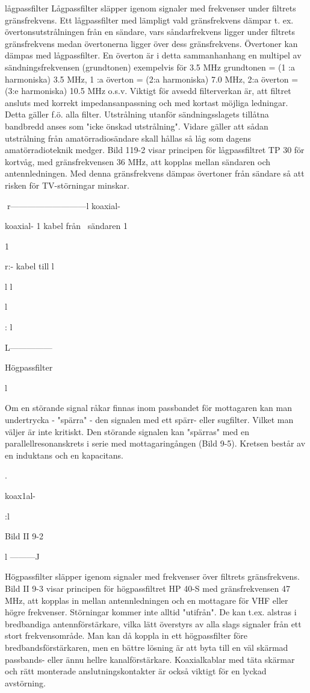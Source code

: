 \documentclass[a4paper,twoside,twocolumn,openright]{book}
\begin{document}
{{{{{lågpassfilter
Lågpassfilter släpper igenom signaler med
frekvenser under filtrets gränsfrekvens.
Ett lågpassfilter med lämpligt vald gränsfrekvens dämpar t. ex. övertonsutstrålningen
från en sändare, vars såndarfrekvens ligger
under filtrets gränsfrekvens medan övertonerna ligger över dess gränsfrekvens.
Övertoner kan dämpas med lågpassfilter. En överton är i detta sammanhanhang
en multipel av sändningsfrekvensen (grundtonen) exempelvis för 3.5 MHz
grundtonen = (1 :a harmoniska) 3.5 MHz,
1 :a överton = (2:a harmoniska) 7.0 MHz,
2:a överton = (3:e harmoniska) 10.5 MHz
o.s.v.
Viktigt för avsedd filterverkan är, att filtret
ansluts med korrekt impedansanpassning
och med kortast möjliga ledningar. Detta
gäller f.ö. alla filter.
Utstrålning utanför sändningsslagets tillåtna bandbredd anses som "icke önskad
utstrålning". Vidare gäller att sådan utstrålning från amatörradiosändare skall hållas så
låg som dagens amatörradioteknik medger.
Bild 119-2 visar principen för lågpassfiltret TP
30 för kortvåg, med gränsfrekvensen 36
MHz, att kopplas mellan sändaren och antennledningen. Med denna gränsfrekvens
dämpas övertoner från sändare så att risken
för TV-störningar minskar.

r---------------------------l koaxial-

koaxial- 1
kabel från~
sändaren 1

1

r:- kabel till
l

l
l

l

:
l

L---------------

Högpassfilter

l

Om en störande signal råkar finnas inom
passbandet för mottagaren kan man undertrycka - "spärra" - den signalen med ett
spärr- eller sugfilter. Vilket man väljer är inte
kritiskt.
Den störande signalen kan "spärras" med
en parallellresonanskrets i serie med
mottagaringången (Bild 9-5). Kretsen består av en induktans och en kapacitans.

.

koax1al-

:l

Bild II 9-2

l
---------J

Högpassfilter släpper igenom signaler med
frekvenser över filtrets gränsfrekvens.
Bild II 9-3 visar principen för högpassfiltret HP 40-S med gränsfrekvensen 47 MHz,
att kopplas in mellan antennledningen och
en mottagare för VHF eller högre frekvenser.
Störningar kommer inte alltid "utifrån".
De kan t.ex. alstras i bredbandiga antennförstärkare, vilka lätt överstyrs av alla slags
signaler från ett stort frekvensområde. Man
kan då koppla in ett högpassfilter före bredbandsförstärkaren, men en bättre lösning är
att byta till en väl skärmad passbands- eller
ännu hellre kanalförstärkare.
Koaxialkablar med täta skärmar och rätt
monterade anslutningskontakter är också
viktigt för en lyckad avstörning.

}}}}}
\end{document}
